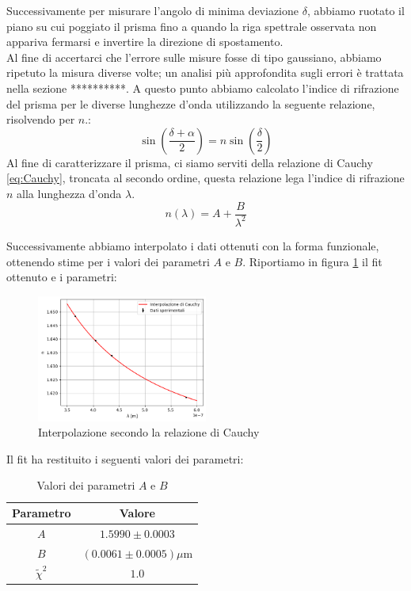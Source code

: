 \documentclass[letterpaper,12pt]{article}
\begin{document}
Successivamente per misurare l'angolo di minima deviazione $\delta$, abbiamo ruotato il piano su cui poggiato il prisma fino a quando
la riga spettrale osservata non appariva fermarsi e invertire la direzione di spostamento. \\
Al fine di accertarci che l'errore sulle misure fosse di tipo gaussiano, abbiamo ripetuto la misura diverse volte; un analisi più
approfondita sugli errori è trattata nella sezione **********.
A questo punto abbiamo calcolato l'indice di rifrazione del prisma per le diverse lunghezze d'onda utilizzando la seguente relazione, risolvendo per $n$.:
$$\sin(\frac{\delta + \alpha}{2}) = n \sin(\frac{\delta}{2})$$
Al fine di caratterizzare il prisma, ci siamo serviti della relazione di Cauchy \eqref{eq:Cauchy}, troncata al secondo ordine,
questa relazione lega l'indice di rifrazione $n$ alla lunghezza d'onda $\lambda$.
\begin{equation}
    n(\lambda) = A + \frac{B}{\lambda^2}
    \label{eq:Cauchy}
\end{equation}

Successivamente abbiamo interpolato i dati ottenuti con la forma funzionale, ottenendo stime per i valori dei parametri $A$ e $B$.
Riportiamo in figura \ref{fig:Cauchy_fit} il fit ottenuto e i parametri:
\begin{figure}[h!]
    \centering
    \includegraphics[width = 0.5\textwidth]{Cauchy_fit.png}
    \caption{Interpolazione secondo la relazione di Cauchy}
    \label{fig:Cauchy_fit}
\end{figure}

Il fit ha restituito i seguenti valori dei parametri:
\begin{table}[h!]
    \centering
    \begin{tabular}{|c|c|}
    \hline
    \textbf{Parametro} & \textbf{Valore} \\
    \hline
    $A$ & $1.5990 \pm 0.0003$ \\
    \hline
    $B$ & $(0.0061 \pm 0.0005) \mu$m \\
    \hline
    $\tilde{\chi}^2$ & $1.0$ \\
    \hline
    \end{tabular}
    \caption{Valori dei parametri $A$ e $B$}
    \label{tab:cauchy_fit}
\end{table}
\end{document}
